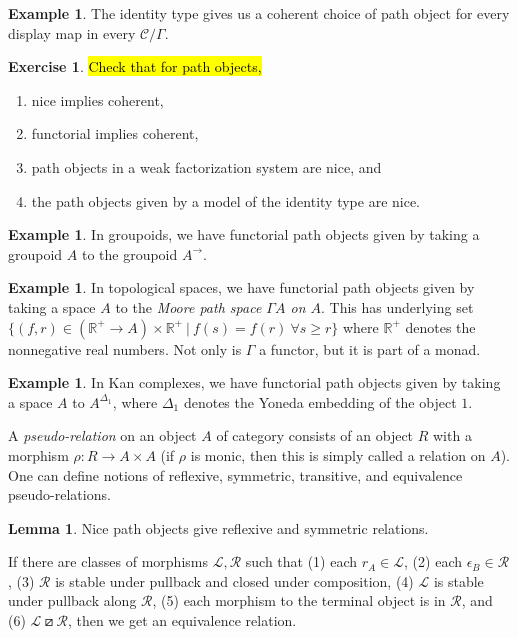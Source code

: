 \documentclass{article}
\theoremstyle{definition}
\newtheorem{lemma}[definition]{Lemma}
\newtheorem{exercise}[definition]{Exercise}
\newtheorem{example}[definition]{Example}
\newcommand{\C}{\mathcal C}
\begin{document}
\begin{example}
    The identity type gives us a coherent choice of path object for every display map in every $\C / \Gamma$.
\end{example}

\begin{exercise}
    \hl{Check that for path objects,}
    \begin{enumerate}
        \item nice implies coherent,
        \item functorial implies coherent,
        \item path objects in a weak factorization system are nice, and
        \item the path objects given by a model of the identity type are nice.
    \end{enumerate}
\end{exercise}

\begin{example}
    In groupoids, we have functorial path objects given by taking a groupoid $A$ to the groupoid $A^\to$.
\end{example}

\begin{example}
    In topological spaces, we have functorial path objects given by taking a space $A$ to the \emph{Moore path space $\Gamma A$ on $A$}. This has underlying set $\{ (f, r) \in (\mathbb R^+ \to A ) \times \mathbb R^+ \ | \ f(s) = f(r) \ \forall s \geq r \}$ where $\mathbb R^+$ denotes the nonnegative real numbers. Not only is $\Gamma$ a functor, but it is part of a monad.
\end{example}

\begin{example}
    In Kan complexes, we have functorial path objects given by taking a space $A$ to $A^{\Delta_1}$, where $\Delta_1$ denotes the Yoneda embedding of the object $1$.
\end{example}

A \emph{pseudo-relation} on an object $A$ of category consists of an object $R$ with a morphism $\rho: R \to A \times A$ (if $\rho$ is monic, then this is simply called a relation on $A$). One can define notions of reflexive, symmetric, transitive, and equivalence pseudo-relations.

\begin{lemma}
    \label{lem:equivalence relation}
    Nice path objects give reflexive and symmetric relations.

    If there are classes of morphisms $\mathcal L, \mathcal R$ such that (1) each $r_A \in \mathcal L$, (2) each $\epsilon_B \in \mathcal R$, (3) $\mathcal R$ is stable under pullback and closed under composition, (4) $\mathcal L$ is stable under pullback along $\mathcal R$, (5) each morphism to the terminal object is in $\mathcal R$, and (6) $\mathcal L \boxslash \mathcal R$, then we get an equivalence relation.
\end{lemma}
\end{document}

